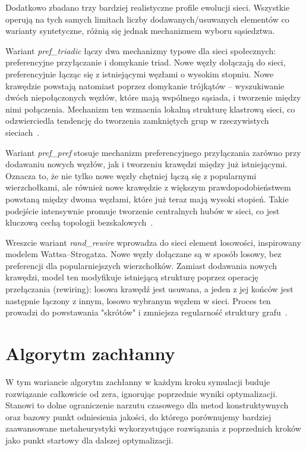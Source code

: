 Dodatkowo zbadano trzy bardziej realistyczne profile ewolucji sieci. Wszystkie operują na tych samych limitach liczby dodawanych/usuwanych elementów co warianty syntetyczne, różnią się jednak mechanizmem wyboru sąsiedztwa.

Wariant \emph{pref\_triadic} łączy dwa mechanizmy typowe dla sieci społecznych: preferencyjne przyłączanie i domykanie triad. Nowe węzły dołączają do sieci, preferencyjnie łącząc się z istniejącymi węzłami o wysokim stopniu. Nowe krawędzie powstają natomiast poprzez domykanie trójkątów -- wyszukiwanie dwóch niepołączonych węzłów, które mają wspólnego sąsiada, i tworzenie między nimi połączenia. Mechanizm ten wzmacnia lokalną strukturę klastrową sieci, co odzwierciedla tendencję do tworzenia zamkniętych grup w rzeczywistych sieciach~\cite{albert2002statistical,kamola2016dynamika}.

Wariant \emph{pref\_pref} stosuje mechanizm preferencyjnego przyłączania zarówno przy dodawaniu nowych węzłów, jak i tworzeniu krawędzi między już istniejącymi. Oznacza to, że nie tylko nowe węzły chętniej łączą się z popularnymi wierzchołkami, ale również nowe krawędzie z większym prawdopodobieństwem powstaną między dwoma węzłami, które już teraz mają wysoki stopień. Takie podejście intensywnie promuje tworzenie centralnych hubów w sieci, co jest kluczową cechą topologii bezskalowych~\cite{albert2002statistical}.

Wreszcie wariant \emph{rand\_rewire} wprowadza do sieci element losowości, inspirowany modelem Wattsa--Strogatza. Nowe węzły dołączane są w sposób losowy, bez preferencji dla popularniejszych wierzchołków. Zamiast dodawania nowych krawędzi, model ten modyfikuje istniejącą strukturę poprzez operację przełączania (rewiring): losowa krawędź jest usuwana, a jeden z jej końców jest następnie łączony z innym, losowo wybranym węzłem w sieci. Proces ten prowadzi do powstawania "skrótów" i zmniejsza regularność struktury grafu~\cite{watts1998collective}.



\section{Algorytm zachłanny}

W tym wariancie algorytm zachłanny w każdym kroku symulacji buduje rozwiązanie całkowicie od zera, ignorując poprzednie wyniki optymalizacji. Stanowi to dolne ograniczenie narzutu czasowego dla metod konstruktywnych oraz bazowy punkt odniesienia jakości, do którego porównujemy bardziej zaawansowane metaheurystyki wykorzystujące rozwiązania z poprzednich kroków jako punkt startowy dla dalszej optymalizacji.

